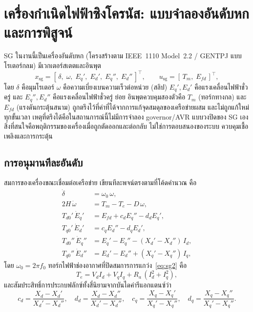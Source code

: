 \documentclass[12pt,a4paper]{article}
\begin{document}
\section{เครื่องกำเนิดไฟฟ้าซิงโครนัส: แบบจำลองอันดับหกและการพิสูจน์}\label{sec:sg}
SG ในงานนี้เป็นเครื่องอันดับหก (โครงสร้างตาม IEEE~1110 Model~2.2 / GENTPJ แบบ
โรเตอร์กลม) มีเวกเตอร์สเตตและอินพุต
\begin{equation}
  x_{\mathrm{sg}}=[\,\delta,\;\omega,\;E_q',\;E_d',\;E_q'',\;E_d''\,]^{\top},
  \qquad u_{\mathrm{sg}}=[\,T_m,\;E_{fd}\,]^{\top},
  \label{eq:sgstate}
\end{equation}
โดย $\delta$ คือมุมโรเตอร์ $\omega$ คือความเบี่ยงเบนความเร็วต่อหน่วย (สลิป)
$E_q',E_d'$ คือแรงเคลื่อนไฟฟ้าชั่วครู่ และ $E_q'',E_d''$ คือแรงเคลื่อนไฟฟ้าชั่วครู่
ย่อย อินพุตควบคุมสองตัวคือ $T_m$ (ทอร์กทางกล) และ $E_{fd}$ (แรงดันกระตุ้นสนาม)
ถูกตรึงไว้ที่ค่าที่ได้จากการแก้จุดสมดุลของเครือข่ายผสม และไม่ถูกแก้ใหม่ทุกขั้นเวลา
เหตุที่ตรึงได้คือในสถานการณ์นี้ไม่มีการจำลอง governor/AVR แบบวงปิดของ SG เอง
สิ่งที่สนใจคือพฤติกรรมของเครื่องเมื่อถูกตัดออกและต่อกลับ ไม่ใช่การตอบสนองของระบบ
ควบคุมเชื้อเพลิงและการกระตุ้น

\subsection{การอนุมานทีละอันดับ}
สมการของเครื่องขณะเชื่อมต่อเครือข่าย เขียนทีละพจน์ตรงตามที่โค้ดคำนวณ คือ
\begin{align}
  \dot\delta            &= \omega_0\,\omega, \label{eq:sg1}\\
  2H\,\dot\omega        &= T_m - T_e - D\,\omega, \label{eq:sg2}\\
  T_{d0}'\,\dot{E}_q'   &= E_{fd} + c_d E_q'' - d_d E_q', \label{eq:sg3}\\
  T_{q0}'\,\dot{E}_d'   &= c_q E_d'' - d_q E_d', \label{eq:sg4}\\
  T_{d0}''\,\dot{E}_q''  &= E_q' - E_q'' - (X_d'-X_d'')\,I_d, \label{eq:sg5}\\
  T_{q0}''\,\dot{E}_d''  &= E_d' - E_d'' + (X_q'-X_q'')\,I_q, \label{eq:sg6}
\end{align}
โดย $\omega_0=2\pi f_0$ ทอร์กไฟฟ้าช่องอากาศที่ปิดสมการการแกว่ง~\eqref{eq:sg2} คือ
\begin{equation}
  T_e = V_d I_d + V_q I_q + R_a\,(I_d^2+I_q^2), \label{eq:sgte}
\end{equation}
และสัมประสิทธิ์การประกบฟลักซ์ทั้งสี่นิยามจากบันไดค่ารีแอกแตนซ์ว่า
\begin{equation}
  c_d=\frac{X_d-X_d'}{X_d'-X_d''},\quad
  d_d=\frac{X_d-X_d''}{X_d'-X_d''},\quad
  c_q=\frac{X_q-X_q'}{X_q'-X_q''},\quad
  d_q=\frac{X_q-X_q''}{X_q'-X_q''}.
  \label{eq:cddd}
\end{equation}
\end{document}
